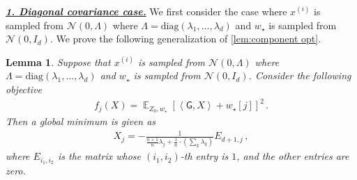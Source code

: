 \documentclass{article}
\DeclareMathOperator{\E}{\mathbb{E}}
\newtheorem{lemma}{Lemma}
\newcommand{\wstar}{w_\star}
\newcommand{\tx}[1]{x^{(#1)}}
\newcommand{\MM}{\mathsf{G}}
\newcommand{\emphh}[1]{\textbf{\emph{#1}}}
\newcommand{\inp}[2]{\left \langle #1,#2\right\rangle}
\begin{document}
\underline{\emphh{1. Diagonal covariance case.}}
We first  consider the case where  $\tx{i}$ is sampled from $\mathcal{N}(0, \Lambda)$ where $\Lambda = \mathrm{diag}(\lambda_1,\dots, \lambda_d)$ and  $\wstar$ is sampled  from $\mathcal{N}(0, I_d)$.  
We prove the following generalization of \autoref{lem:component opt}.

\begin{lemma} \label{lem:component opt_noniso}
Suppose that $\tx{i}$ is sampled from $\mathcal{N}(0, \Lambda)$ where $\Lambda = \mathrm{diag}(\lambda_1,\dots, \lambda_d)$ and  $\wstar$ is sampled  from $\mathcal{N}(0, I_d)$. 
Consider the following objective
\begin{align}
f_j(X) =  \E_{Z_0,\wstar}\left[ \inp{\MM}{X}  + \wstar[j] \right]^2\,.
\end{align} 
Then a global minimum is given as 
\begin{align} \label{exp:opt_single_non}
X_j = - \frac{1}{  \frac{n+1}{n}  \lambda_j +   \frac{1}{n} \cdot \left( \sum_k \lambda_k  \right)   } E_{d+1,j}\,,
\end{align} where $E_{i_1,i_2}$ is the matrix whose $(i_1,i_2)$-th entry is $1$,  and the other entries are zero.
\end{lemma}
\end{document}
